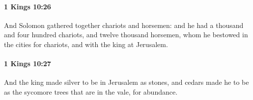 		\paragraph{1 Kings 10:26} %
			\label{1KINGS-10-26}

			And Solomon gathered together chariots and horsemen: and he had a thousand and four hundred chariots, and twelve thousand horsemen, whom he bestowed in the cities for chariots, and with the king at Jerusalem.


		\paragraph{1 Kings 10:27} %
			\label{1KINGS-10-27}

			And the king made silver to be in Jerusalem as stones, and cedars made he to be as the sycomore trees that are in the vale, for abundance.


